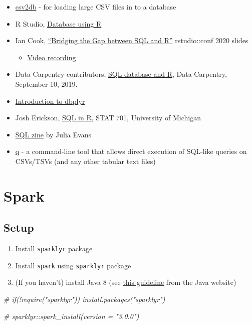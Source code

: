 \documentclass[
]{book}
\newenvironment{Shaded}{\begin{snugshade}}{\end{snugshade}}
\newcommand{\CommentTok}[1]{\textcolor[rgb]{0.56,0.35,0.01}{\textit{#1}}}
\providecommand{\tightlist}{%
  \setlength{\itemsep}{0pt}\setlength{\parskip}{0pt}}
\begin{document}
\begin{itemize}
\tightlist
\item
  \href{https://github.com/csv2db/csv2db}{csv2db} - for loading large CSV files in to a database
\item
  R Studio, \href{https://db.rstudio.com/}{Database using R}
\item
  Ian Cook, \href{https://github.com/ianmcook/rstudioconf2020/blob/master/bridging_the_gap_between_sql_and_r.pdf}{``Bridging the Gap between SQL and R''} rstudio::conf 2020 slides

  \begin{itemize}
  \tightlist
  \item
    \href{https://www.youtube.com/watch?v=JwP5KdWSgqE\&ab_channel=RStudio}{Video recording}
  \end{itemize}
\item
  Data Carpentry contributors, \href{https://datacarpentry.org/R-ecology-lesson/05-r-and-databases.html}{SQL database and R}, Data Carpentry, September 10, 2019.
\item
  \href{https://cran.r-project.org/web/packages/dbplyr/vignettes/dbplyr.html}{Introduction to dbplyr}
\item
  Josh Erickson, \href{http://dept.stat.lsa.umich.edu/~jerrick/courses/stat701/notes/sql.html}{SQL in R}, STAT 701, University of Michigan
\item
  \href{https://wizardzines.com/zines/sql/}{SQL zine} by Julia Evans
\item
  \href{http://harelba.github.io/q/}{q} - a command-line tool that allows direct execution of SQL-like queries on CSVs/TSVs (and any other tabular text files)
\end{itemize}

\hypertarget{spark}{%
\section{Spark}\label{spark}}

\hypertarget{setup-11}{%
\subsection{Setup}\label{setup-11}}

\begin{enumerate}
\def\labelenumi{\arabic{enumi}.}
\tightlist
\item
  Install \texttt{sparklyr} package
\item
  Install \texttt{spark} using \texttt{sparklyr} package
\item
  (If you haven't) install Java 8 (see \href{https://www.java.com/en/download/manual.jsp}{this guideline} from the Java website)
\end{enumerate}

\begin{Shaded}
\begin{Highlighting}[]
\CommentTok{\# if(!require("sparklyr")) install.packages("sparklyr")}

\CommentTok{\# sparklyr::spark\_install(version = "3.0.0")}
\end{Highlighting}
\end{Shaded}


  
\end{document}
